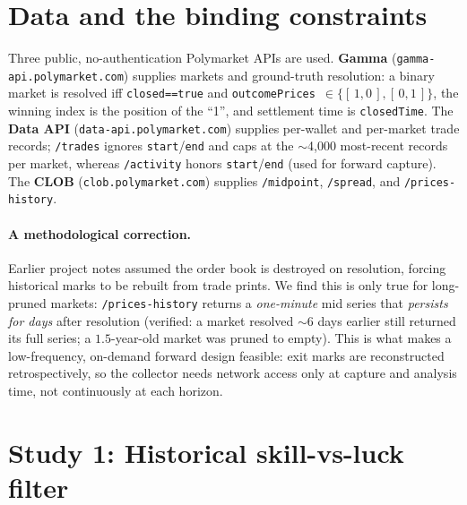 \documentclass[11pt]{article}
\begin{document}
\section{Data and the binding constraints}
Three public, no-authentication Polymarket APIs are used. \textbf{Gamma}
(\texttt{gamma-api.polymarket.com}) supplies markets and ground-truth resolution: a binary
market is resolved iff \texttt{closed==true} and \texttt{outcomePrices}~$\in
\{[\,1,0\,],[\,0,1\,]\}$, the winning index is the position of the ``1'', and settlement time
is \texttt{closedTime}. The \textbf{Data API} (\texttt{data-api.polymarket.com}) supplies
per-wallet and per-market trade records; \texttt{/trades} ignores \texttt{start}/\texttt{end}
and caps at the $\sim$4{,}000 most-recent records per market, whereas \texttt{/activity}
honors \texttt{start}/\texttt{end} (used for forward capture). The \textbf{CLOB}
(\texttt{clob.polymarket.com}) supplies \texttt{/midpoint}, \texttt{/spread}, and
\texttt{/prices-history}.

\paragraph{A methodological correction.} Earlier project notes assumed the order book is
destroyed on resolution, forcing historical marks to be rebuilt from trade prints. We find
this is only true for long-pruned markets: \texttt{/prices-history} returns a \emph{one-minute}
mid series that \emph{persists for days} after resolution (verified: a market resolved
$\sim$6 days earlier still returned its full series; a $1.5$-year-old market was pruned to
empty). This is what makes a low-frequency, on-demand forward design feasible: exit marks are
reconstructed retrospectively, so the collector needs network access only at capture and
analysis time, not continuously at each horizon.

\section{Study 1: Historical skill-vs-luck filter}
\end{document}
